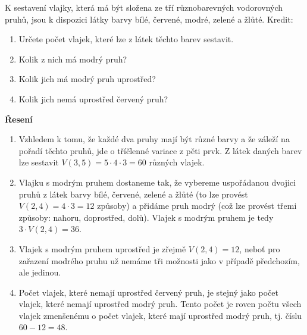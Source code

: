 \begin{mdframed}[style=mdexam]
  \begin{example}\label{mai:exam099}
    K sestavení vlajky, která má být složena ze tří různobarevných vodorovných pruhů, jsou k
    dispozici látky barvy bílé, červené, modré, zelené a žlůté. Kredit:
    \cite[s.~14]{calda2008matematika} \newline
    \begin{enumerate}[noitemsep]
      \item Určete počet vlajek, které lze z látek těchto barev sestavit.
      \item Kolik z nich má modrý pruh?
      \item Kolik jich má modrý pruh uprostřed?
      \item Kolik jich nemá uprostřed červený pruh?  
    \end{enumerate}
    \textbf{Řesení}
    \begin{enumerate}[noitemsep]
      \item Vzhledem k tomu, že každé dva pruhy mají být různé barvy a že záleží na pořadí těchto
            pruhů, jde o tříčlenné variace z pěti prvk. Z látek daných barev lze sestavit \(V(3,5) =
            5\cdot4\cdot3=60\) různých vlajek.
      \item Vlajku s modrým pruhem dostaneme tak, že vybereme uspořádanou dvojici pruhů z látek
            barvy bílé, červené, zelené a žlůté (to lze provést \(V(2,4)=4\cdot3=12\) způsoby) a
            přidáme pruh modrý (což lze provést třemi způsoby: nahoru, doprostřed, dolů). Vlajek s
            modrým pruhem je tedy \(3\cdot V(2,4)=36\).
      \item Vlajek s modrým pruhem uprostřed je zřejmě \(V(2,4)=12\), neboť pro zařazení modrého
            pruhu už nemáme tři možnosti jako v případě předchozím, ale jedinou. 
      \item Počet vlajek, které nemají uprostřed červený pruh, je stejný jako počet vlajek, které
            nemají uprostřed modrý pruh. Tento počet je roven počtu všech vlajek zmenšenému o počet
            vlajek, které mají uprostřed modrý pruh, tj. číslu \(60-12=48\).
    \end{enumerate}


  \end{example}
\end{mdframed}
